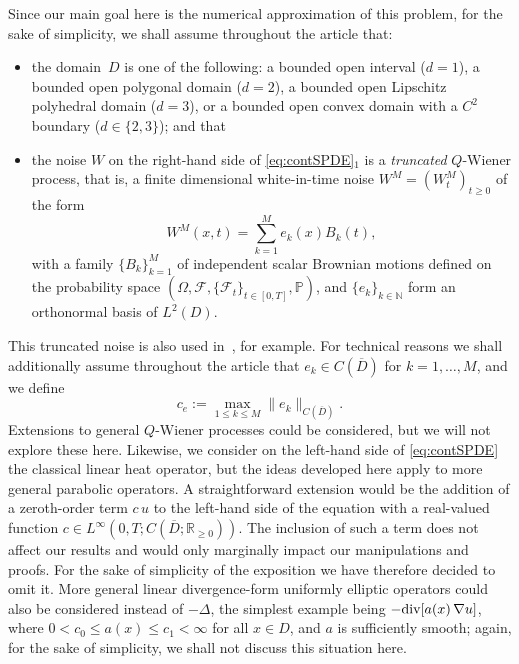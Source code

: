\documentclass[12pt]{article}
\begin{document}
Since our main goal here is the numerical approximation of this problem, for the sake of simplicity, we shall assume throughout the article that: 
\begin{itemize}
\item[(a)] the domain~$D$ is one of the following: a bounded open interval ($d=1$), a bounded open polygonal domain ($d=2$), a bounded open Lipschitz polyhedral domain ($d=3$), or a bounded open convex domain with a $C^2$ boundary ($d \in \{2,3\}$);  and that 
\item[(b)]
the noise $ W$ on the right-hand side of \eqref{eq:contSPDE}$_1$ is a \emph{truncated} $Q$-Wiener process, that is, a finite dimensional white-in-time noise $W^M = (W^M_t)_{t\geq 0}$ of the form 
\begin{equation}\label{noise_expansion}
    W^M(x,t) = \sum_{k=1}^M e_k(x) B_k(t),
\end{equation}
with a family $\{B_{k}\}_{k=1}^M$ of independent scalar Brownian motions defined on the probability space $(\Omega, \mathcal{F}, \{\mathcal{F}_t\}_{t \in [0,T]}, \mathbb{P})$, 
and $\{{e}_{k}\}_{k\in \mathbb{N}}$ form  an orthonormal basis of $L^2(D)$.  
\end{itemize}

This truncated noise is also used in~\cite{gyongy2005discretization,gyongy2009rate}, for example. 
For technical reasons we shall additionally assume throughout the article that $e_k \in C(\overline{D})$ for $k=1,\ldots,M$, and we define
\begin{equation}\label{eq:noise}
    c_e:= \max_{1 \leq k \leq M} \|e_k\|_{C(\overline{D})}.
\end{equation}
%
Extensions to general $Q$-Wiener processes could be considered, but we will not explore these here. Likewise, we consider on the left-hand side of \eqref{eq:contSPDE} the classical linear heat operator, but the ideas developed here apply to more general parabolic operators. A straightforward extension would be the addition of a zeroth-order term $c\,u$ to the left-hand side of the equation with a real-valued function $c \in L^\infty(0,T; C(\overline{D};\mathbb{R}_{\geq 0}))$. The inclusion of such a term does not affect our results and would only marginally impact our manipulations and proofs. For the sake of simplicity of the exposition we have therefore decided to omit it.  More general linear divergence-form uniformly elliptic operators could also be considered instead of $-\Delta$, the simplest example being $-\hbox{\rm div} [a(x)\,\nabla u]$, where $0 < c_0 \leq a(x) \leq c_1 < \infty$ for all $x \in D$, and $a$ is sufficiently smooth; again, for the sake of simplicity, we shall not discuss this situation here.
\end{document}
